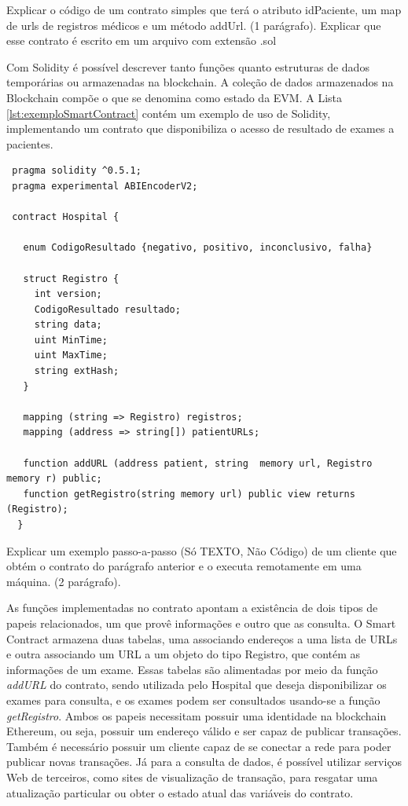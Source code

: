 \documentclass[a4paper,11pt]{article}
\begin{document}
{\color{ForestGreen}Explicar o código de um contrato simples que terá o atributo idPaciente, um map de urls de registros médicos e um método addUrl. (1 parágrafo). Explicar que esse contrato é escrito em um arquivo com extensão .sol}

Com Solidity é possível descrever tanto funções quanto estruturas de dados temporárias ou armazenadas na blockchain.
A coleção de dados armazenados na Blockchain compõe o que se denomina como estado da EVM. A Lista \ref{lst:exemploSmartContract} contém um exemplo de uso de Solidity, implementando um contrato que disponibiliza o acesso de resultado de exames a pacientes.

\begin{lstlisting}
 pragma solidity ^0.5.1;
 pragma experimental ABIEncoderV2;

 contract Hospital {

   enum CodigoResultado {negativo, positivo, inconclusivo, falha}

   struct Registro {
     int version;
     CodigoResultado resultado;
     string data;
     uint MinTime;
     uint MaxTime;
     string extHash;
   }

   mapping (string => Registro) registros;
   mapping (address => string[]) patientURLs;

   function addURL (address patient, string  memory url, Registro memory r) public;
   function getRegistro(string memory url) public view returns (Registro);
  }
\end{lstlisting}


{\color{ForestGreen}Explicar um exemplo passo-a-passo (Só TEXTO, Não Código) de um cliente que obtém o contrato do parágrafo anterior e o executa remotamente em uma máquina. (2 parágrafo).}

As funções implementadas no contrato apontam a existência de dois tipos de papeis relacionados, um que provê informações e outro que as consulta. O Smart Contract armazena duas tabelas, uma associando endereços a uma lista de URLs e outra associando um URL a um objeto do tipo Registro, que contém as informações de um exame. Essas tabelas são alimentadas por meio da função \emph{addURL} do contrato, sendo utilizada pelo Hospital que deseja disponibilizar os exames para consulta, e os exames podem ser consultados usando-se a função \emph{getRegistro}. Ambos os papeis necessitam possuir uma identidade na blockchain Ethereum, ou seja, possuir um endereço válido e ser capaz de publicar transações. Também é necessário possuir um cliente capaz de se conectar a rede para poder publicar novas transações. Já para a consulta de dados, é possível utilizar serviços Web de terceiros, como sites de visualização de transação, para resgatar uma atualização particular ou obter o estado atual das variáveis do contrato.
\end{document}
